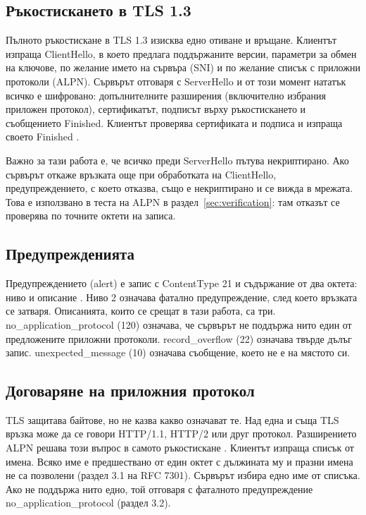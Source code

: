 \subsection{Ръкостискането в TLS 1.3}

Пълното ръкостискане в TLS 1.3 изисква едно отиване и връщане. Клиентът изпраща
ClientHello, в което предлага поддържаните версии, параметри за обмен на ключове, по
желание името на сървъра (SNI) и по желание списък с приложни протоколи (ALPN). Сървърът
отговаря с ServerHello и от този момент нататък всичко е шифровано: допълнителните
разширения (включително избрания приложен протокол), сертификатът, подписът върху
ръкостискането и съобщението Finished. Клиентът проверява сертификата и подписа и
изпраща своето Finished \cite{rfc8446}.

Важно за тази работа е, че всичко преди ServerHello пътува некриптирано. Ако сървърът
откаже връзката още при обработката на ClientHello, предупреждението, с което отказва,
също е некриптирано и се вижда в мрежата. Това е използвано в теста на ALPN в
раздел~\ref{sec:verification}: там отказът се проверява по точните октети на записа.

\subsection{Предупрежденията}

Предупреждението (alert) е запис с ContentType 21 и съдържание от два октета: ниво и
описание \cite{rfc8446}. Ниво 2 означава фатално предупреждение, след което връзката се
затваря. Описанията, които се срещат в тази работа, са три. no\_application\_protocol
(120) означава, че сървърът не поддържа нито един от предложените приложни протоколи.
record\_overflow (22) означава твърде дълъг запис. unexpected\_message (10) означава
съобщение, което не е на мястото си.

\subsection{Договаряне на приложния протокол}

TLS защитава байтове, но не казва какво означават те. Над една и съща TLS връзка може да
се говори HTTP/1.1, HTTP/2 или друг протокол. Разширението ALPN решава този въпрос в
самото ръкостискане \cite{rfc7301}. Клиентът изпраща списък от имена. Всяко име е
предшествано от един октет с дължината му и празни имена не са позволени (раздел 3.1 на
RFC 7301). Сървърът избира едно име от списъка. Ако не поддържа нито едно, той отговаря с
фаталното предупреждение no\_application\_protocol (раздел 3.2).

